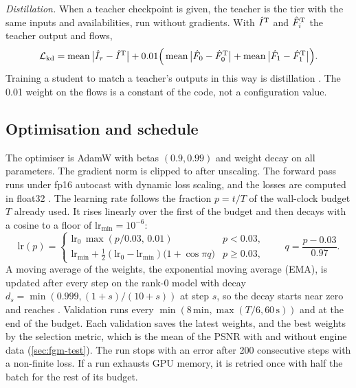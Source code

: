 \emph{Distillation.} When a teacher checkpoint is given, the teacher is the  tier with the same inputs and availabilities, run without gradients. With $\hat I^{\rm T}$ and $\hat F^{\rm T}_i$ the teacher output and flows,
\begin{equation}
\mathcal L_{\rm kd}=\operatorname{mean}\big|\hat I_\tau-\hat I^{\rm T}\big|+0.01\Big(\operatorname{mean}\big|\hat F_0-\hat F^{\rm T}_0\big|+\operatorname{mean}\big|\hat F_1-\hat F^{\rm T}_1\big|\Big).\label{eq:fgm-kd}
\end{equation}
Training a student to match a teacher's outputs in this way is distillation \cite{gou2021knowledge}. The 0.01 weight on the flows is a constant of the code, not a configuration value.

\subsection{Optimisation and schedule}\label{sec:fgm-schedule}

The optimiser is AdamW \cite{loshchilov2019adamw} with betas $(0.9,0.99)$ and weight decay  on all parameters. The gradient norm is clipped to  after unscaling. The forward pass runs under fp16 autocast with dynamic loss scaling, and the losses are computed in float32 \cite{micikevicius2018mixed}. The learning rate follows the fraction $p=t/T$ of the wall-clock budget $T$ already used. It rises linearly over the first  of the budget and then decays with a cosine to a floor of $\mathrm{lr}_{\min}=10^{-6}$:
\begin{equation}
\mathrm{lr}(p)=\begin{cases}\mathrm{lr}_0\,\max(p/0.03,\,0.01) & p<0.03,\\ \mathrm{lr}_{\min}+\tfrac12(\mathrm{lr}_0-\mathrm{lr}_{\min})\big(1+\cos\pi q\big) & p\geq0.03,\end{cases}\qquad q=\frac{p-0.03}{0.97}.\label{eq:fgm-lr}
\end{equation}
A moving average of the weights, the exponential moving average (EMA), is updated after every step on the rank-0 model with decay $d_s=\min(0.999,(1+s)/(10+s))$ at step $s$, so the decay starts near zero and reaches . Validation runs every $\min(8\,\mathrm{min},\max(T/6,60\,\mathrm{s}))$ and at the end of the budget. Each validation saves the latest weights, and the best weights by the selection metric, which is the mean of the PSNR with and without engine data (\cref{sec:fgm-test}). The run stops with an error after 200 consecutive steps with a non-finite loss. If a run exhausts GPU memory, it is retried once with half the batch for the rest of its budget.

